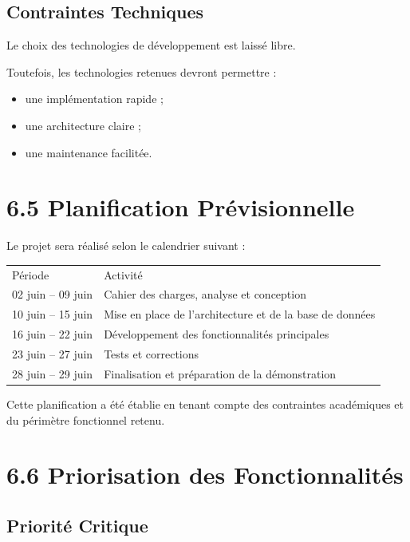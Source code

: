 \documentclass[12pt,a4paper]{report}
\begin{document}
\subsection{Contraintes Techniques}\label{contraintes-techniques}

Le choix des technologies de développement est laissé libre.

Toutefois, les technologies retenues devront permettre :

\begin{itemize}
\item
  une implémentation rapide ;
\item
  une architecture claire ;
\item
  une maintenance facilitée.
\end{itemize}

\section{6.5 Planification
Prévisionnelle}\label{planification-pruxe9visionnelle}

Le projet sera réalisé selon le calendrier suivant :

\begin{longtable}[]{@{}ll@{}}
\toprule
\endhead
Période & Activité \\
02 juin -- 09 juin & Cahier des charges, analyse et conception \\
10 juin -- 15 juin & Mise en place de l'architecture et de la base de
données \\
16 juin -- 22 juin & Développement des fonctionnalités principales \\
23 juin -- 27 juin & Tests et corrections \\
28 juin -- 29 juin & Finalisation et préparation de la démonstration \\
\bottomrule
\end{longtable}

Cette planification a été établie en tenant compte des contraintes
académiques et du périmètre fonctionnel retenu.

\section{6.6 Priorisation des
Fonctionnalités}\label{priorisation-des-fonctionnalituxe9s}

\subsection{Priorité Critique}\label{priorituxe9-critique}
\end{document}
